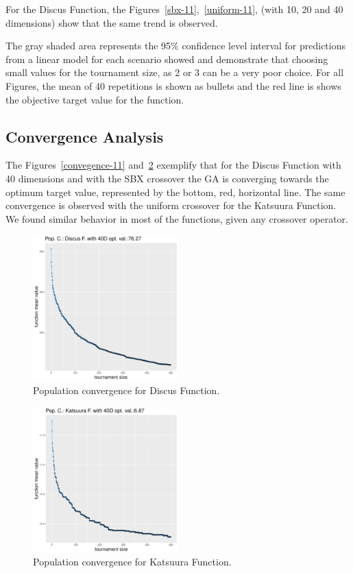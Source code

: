 For the Discus Function, the Figures~\ref{sbx-11},~\ref{uniform-11}, (with 10, 20 and 40 dimensions) show that the same trend is observed. 

The gray shaded area represents the 95\% confidence level interval for predictions from a linear model for each scenario showed and demonstrate that choosing small values for the tournament size, as 2 or 3 can be a very poor choice. For all Figures, the mean of 40 repetitions is shown as bullets and the red line is shows the objective target value for the function.


\subsection{Convergence Analysis}
The Figures~\ref{convegence-11} and~\ref{convergence-23} exemplify that for the Discus Function with 40 dimensions and with the SBX crossover the GA is converging towards the optimum target value, represented by the bottom, red, horizontal line. The same convergence is observed with the uniform crossover for the Katsuura Function. We found similar behavior in most of the functions, given any crossover operator.

\begin{figure}[t]
	\includegraphics[width=0.5\textwidth]{img/uniform-40D/covergency_unimodal_uniform_11_dim_40.pdf}
	\caption{Population convergence for Discus Function.}
	\label{convegence-uniform-11}
\end{figure}


\begin{figure}[t]
	\includegraphics[width=0.5\textwidth]{img/SBX-40D/covergency_multimodal_sbx_23_dim_40.pdf}
	\caption{Population convergence for Katsuura Function.}
	\label{convergence-23}
\end{figure}



